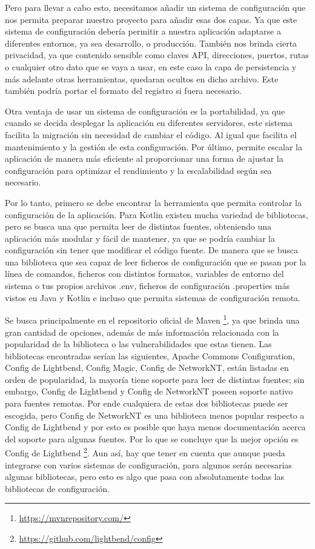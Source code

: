 Pero para llevar a cabo esto, necesitamos añadir un sistema de configuración que nos permita preparar nuestro 
proyecto para añadir esas dos capas. Ya que este sistema de configuración debería permitir a nuestra aplicación 
adaptarse a diferentes entornos, ya sea desarrollo, o producción. También nos brinda cierta privacidad, ya que 
contenido sensible como claves API, direcciones, puertos, rutas o cualquier otro dato que se vaya a usar, en 
este caso la capa de persistencia y más adelante otras herramientas, quedaran ocultos en dicho archivo. Este 
también podría portar el formato del registro si fuera necesario.
 
Otra ventaja de usar un sistema de configuración es la portabilidad, ya que cuando se decida desplegar la 
aplicación en diferentes servidores, este sistema facilita la migración sin necesidad de cambiar el código. Al 
igual que facilita el mantenimiento y la gestión de esta configuración. Por último, permite escalar la 
aplicación de manera más eficiente al proporcionar una forma de ajustar la configuración para optimizar el 
rendimiento y la escalabilidad según sea necesario.

Por lo tanto, primero se debe encontrar la herramienta que permita controlar la configuración de la aplicación. 
Para Kotlin existen mucha variedad de bibliotecas, pero se busca una que permita leer de distintas fuentes, 
obteniendo una aplicación más modular y fácil de mantener, ya que se podría cambiar la configuración sin tener 
que modificar el código fuente. De manera que se busca una biblioteca que sea capaz de leer ficheros de 
configuración que se pasan por la línea de comandos, ficheros con distintos formatos, variables de entorno del 
sistema o tus propios archivos .env, ficheros de configuración .properties más vistos en Java y Kotlin e incluso 
que permita sistemas de configuración remota.

Se busca principalmente en el repositorio oficial de Maven \footnote{\url{https://mvnrepository.com/}}, ya que
brinda una gran cantidad de opciones, además de más información relacionada con la popularidad de la biblioteca o 
las vulnerabilidades que estas tienen. Las bibliotecas encontradas serían las siguientes, Apache Commons 
Configuration, Config de Lightbend, Config Magic, Config de NetworkNT, están listadas en orden de popularidad, la 
mayoría tiene soporte para leer de distintas fuentes; sin embargo, Config de Lightbend y  Config de NetworkNT 
poseen soporte nativo para fuentes remotas. Por ende cualquiera de estas dos bibliotecas puede ser escogida, pero 
Config de NetworkNT es una biblioteca menos popular respecto a Config de Lightbend y por esto es posible que haya 
menos documentación acerca del soporte para algunas fuentes. Por lo que se concluye que la mejor opción es Config 
de Lightbend \footnote{\url{https://github.com/lightbend/config}}. Aun así, hay que tener en cuenta que aunque 
pueda integrarse con varios sistemas de configuración, para algunos serán necesarias algunas bibliotecas, pero 
esto es algo que pasa con absolutamente todas las bibliotecas de configuración.